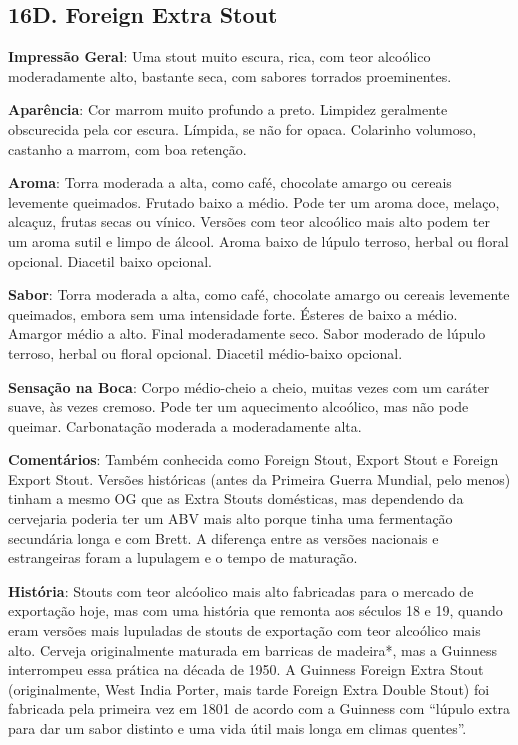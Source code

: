 \subsection*{16D. Foreign Extra Stout}

\textbf{Impressão Geral}: Uma stout muito escura, rica, com teor alcoólico moderadamente alto, bastante seca, com sabores torrados proeminentes.

\textbf{Aparência}: Cor marrom muito profundo a preto. Limpidez geralmente obscurecida pela cor escura. Límpida, se não for opaca. Colarinho volumoso, castanho a marrom, com boa retenção.

\textbf{Aroma}: Torra moderada a alta, como café, chocolate amargo ou cereais levemente queimados. Frutado baixo a médio. Pode ter um aroma doce, melaço, alcaçuz, frutas secas ou vínico. Versões com teor alcoólico mais alto podem ter um aroma sutil e limpo de álcool. Aroma baixo de lúpulo terroso, herbal ou floral opcional. Diacetil baixo opcional.

\textbf{Sabor}: Torra moderada a alta, como café, chocolate amargo ou cereais levemente queimados, embora sem uma intensidade forte. Ésteres de baixo a médio. Amargor médio a alto. Final moderadamente seco. Sabor moderado de lúpulo terroso, herbal ou floral opcional. Diacetil médio-baixo opcional.

\textbf{Sensação na Boca}: Corpo médio-cheio a cheio, muitas vezes com um caráter suave, às vezes cremoso. Pode ter um aquecimento alcoólico, mas não pode queimar. Carbonatação moderada a moderadamente alta.

\textbf{Comentários}: Também conhecida como Foreign Stout, Export Stout e Foreign Export Stout. Versões históricas (antes da Primeira Guerra Mundial, pelo menos) tinham a mesmo OG que as Extra Stouts domésticas, mas dependendo da cervejaria poderia ter um ABV mais alto porque tinha uma fermentação secundária longa e com Brett. A diferença entre as versões nacionais e estrangeiras foram a lupulagem e o tempo de maturação.

\textbf{História}: Stouts com teor alcóolico mais alto fabricadas para o mercado de exportação hoje, mas com uma história que remonta aos séculos 18 e 19, quando eram versões mais lupuladas de stouts de exportação com teor alcoólico mais alto. Cerveja originalmente maturada em barricas de madeira*, mas a Guinness interrompeu essa prática na década de 1950. A Guinness Foreign Extra Stout (originalmente, West India Porter, mais tarde Foreign Extra Double Stout) foi fabricada pela primeira vez em 1801 de acordo com a Guinness com “lúpulo extra para dar um sabor distinto e uma vida útil mais longa em climas quentes”.

